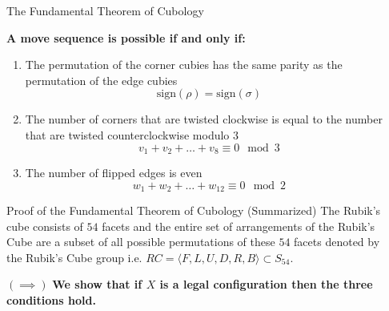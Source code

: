 \documentclass[final]{beamer}
\newlength{\sepwidth}
\newlength{\colwidth}
\newcommand{\separatorcolumn}{\begin{column}{\sepwidth}\end{column}}
\begin{document}
\begin{frame}[t]
\begin{columns}[t]
\separatorcolumn

\begin{column}{\colwidth}

  \begin{alertblock}{The Fundamental Theorem of Cubology}

    \textbf{A move sequence is possible if and only if:}

    \begin{enumerate}
      \item The permutation of the corner cubies has the same parity as the permutation of the edge cubies
      $$\text{sign}(\rho) = \text{sign}(\sigma)$$
      \item The number of corners that are twisted clockwise is equal to the number that are twisted counterclockwise modulo $3$
      $$v_{1} + v_{2} +\dots +v_{8} \equiv 0 \mod 3$$
      \item The number of flipped edges is even
      $$w_{1} + w_{2} +\dots +w_{12} \equiv 0 \mod 2$$
    \end{enumerate}


  \end{alertblock}

  \begin{block}{Proof of the Fundamental Theorem of Cubology (Summarized)}
    The Rubik's cube consists of $54$ facets and the entire set of arrangements of the Rubik's Cube are a subset of all possible permutations of these $54$ facets
    denoted by the Rubik's Cube group i.e. $RC = \langle F,L,U,D,R,B\rangle \subset S_{54}$.



$(\implies)$
\textbf{We show that if $X$ is a legal configuration then the three conditions hold.}


\end{block}
\end{column}
\end{columns}
\end{frame}
\end{document}
